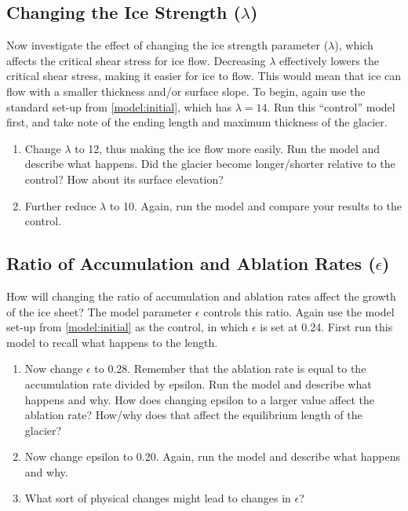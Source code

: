 \documentclass[11pt,letterpaper]{article}
\begin{document}
\subsection{Changing the Ice Strength ($\lambda$)}

Now investigate the effect of changing the ice strength parameter ($\lambda$), which affects the critical shear stress for ice flow. Decreasing $\lambda$ effectively lowers the critical shear stress, making it easier for ice to flow. This would mean that ice can flow with a smaller thickness and/or surface slope. To begin, again use the standard set-up from \ref{model:initial}, which has $\lambda=14$. Run this ``control'' model first, and take note of the ending length and maximum thickness of the glacier. 

\begin{enumerate}[label=(\alph*)]
\item Change $\lambda$ to 12, thus making the ice flow more easily. Run the model and describe what happens. Did the glacier become longer/shorter relative to the control? How about its surface elevation?

\item Further reduce $\lambda$ to 10. Again, run the model and compare your results to the control.
\end{enumerate}


\subsection{Ratio of Accumulation and Ablation Rates ($\epsilon$)}

How will changing the ratio of accumulation and ablation rates affect the growth of the ice sheet?  The model parameter $\epsilon$ controls this ratio.  Again use the model set-up from \ref{model:initial} as the control, in which $\epsilon$ is set at 0.24. First run this model to recall what happens to the length. 

\begin{enumerate}[label=(\alph*)]
\item Now change $\epsilon$ to 0.28. Remember that the ablation rate is equal to the accumulation rate divided by epsilon. Run the model and describe what happens and why. How does changing epsilon to a larger value affect the ablation rate? How/why does that affect the equilibrium length of the glacier?

\item Now change epsilon to 0.20. Again, run the model and describe what happens and why.

\item What sort of physical changes might lead to changes in $\epsilon$?
\end{enumerate}
\end{document}
